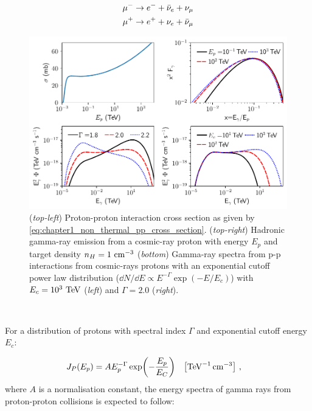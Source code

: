 \begin{equation}
    \begin{aligned}
    \muonminus &\rightarrow e^- + \bar{\nu}_e+\nu_\mu \\
    \muonplus &\rightarrow e^+ + \nu_e + \bar{\nu}_\mu
    \end{aligned}
\end{equation}
\begin{figure}[h!]
    \centering
    \includegraphics[width=\textwidth]{04_Introduction/Images/non_thermal_emission/hadronic_interaction.pdf}
    \caption{(\textit{top-left}) Proton-proton interaction cross section as given by \autoref{eq:chapter1_non_thermal_pp_cross_section}. (\textit{top-right}) Hadronic gamma-ray emission from a cosmic-ray proton with energy $E_p$ and target density $n_H=1~\si{\per\centi\meter\cubed}$ (\textit{bottom}) Gamma-ray spectra from p-p interactions from cosmic-rays protons with an exponential cutoff power law distribution ($\dd{N}/\dd{E}\propto E^{-\Gamma}\exp(-E/E_c)$) with $E_c=10^3~\TeV$ (\textit{left}) and $\Gamma=2.0$ (\textit{right}).}
    \label{fig:chapter_1_non_thermal_hadronic_emission}
\end{figure}
\par~\par
For a distribution of protons with spectral index $\Gamma$ and exponential cutoff energy $E_c$:

\begin{equation}
    \begin{aligned}
    J_P\qty(E_p) &= A E_p^{-\Gamma} \exp(-\frac{E_p}{E_C})\quad\qty[\si{\per\tera\electronvolt\per\centi\meter\cubed}]\text{ ,}
    \end{aligned}
\end{equation}
\noindent where $A$ is a normalisation constant, the energy spectra of gamma rays from proton-proton collisions is expected to follow:

